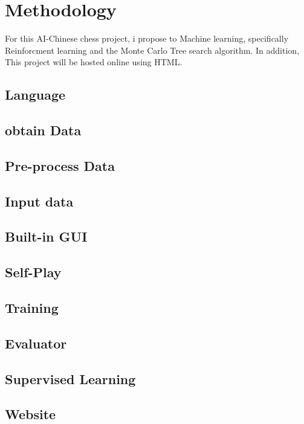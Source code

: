 \documentclass[10pt,twocolumn]{article}
\begin{document}
\section{Methodology}
    For this AI-Chinese chess project, i propose to Machine learning, specifically Reinforcment learning and the Monte Carlo Tree search algorithm. In addition, This project will be hosted online using HTML.
    
\subsection{Language}
\subsection{obtain Data}
\subsection{Pre-process Data}
\subsection{Input data}
\subsection{Built-in GUI}
\subsection{Self-Play}
\subsection{Training}
\subsection{Evaluator}
\subsection{Supervised Learning}
\subsection{Website }
\end{document}

